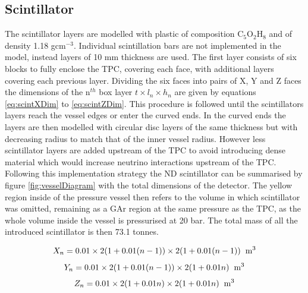 \subsection{Scintillator}
The scintillator layers are modelled with plastic of composition C$_{5}$O$_{2}$H$_{8}$ and of density 1.18 gcm$^{-3}$. Individual scintillation bars are not implemented in the model, instead layers of 10 mm thickness are used. The first layer consists of six blocks to fully enclose the TPC, covering each face, with additional layers covering each previous layer. Dividing the six faces into pairs of X, Y and Z faces the dimensions of the n$^{th}$ box layer $t \times l_{n} \times h_{n}$ are given by equations \ref{eq:scintXDim} to \ref{eq:scintZDim}. This procedure is followed until the scintillators layers reach the vessel edges or enter the curved ends. In the curved ends the layers are then modelled with circular disc layers of the same thickness but with decreasing radius to match that of the inner vessel radius. However less scintillator layers are added upstream of the TPC to avoid introducing dense material which would increase neutrino interactions upstream of the TPC. Following this implementation strategy the ND scintillator can be summarised by figure \ref{fig:vesselDiagram} with the total dimensions of the detector. The yellow region inside of the pressure vessel then refers to the volume in which scintillator was omitted, remaining as a GAr region at the same pressure as the TPC, as the whole volume inside the vessel is pressurised at 20 bar. The total mass of all the introduced scintillator is then 73.1 tonnes.

\begin{equation}
	X_{n} = 0.01 \times 2(1 + 0.01(n-1)) \times 2(1 + 0.01(n-1)) \hspace{2mm} \textnormal{m}^{3}
	\label{eq:scintXDim}
\end{equation}
\vspace{-6mm}
\begin{equation}
	Y_{n} = 0.01 \times 2(1 + 0.01(n-1)) \times 2(1 + 0.01n) \hspace{2mm} \textnormal{m}^{3}
	\label{eq:scintYDim}
\end{equation}
\vspace{-6mm}
\begin{equation}
	Z_{n} = 0.01 \times 2(1 + 0.01n) \times 2(1 + 0.01n) \hspace{2mm} \textnormal{m}^{3}
	\label{eq:scintZDim}
\end{equation}


